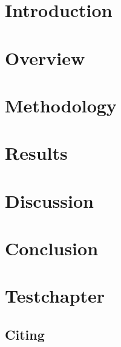 \documentclass[a4paper, english]{ttlab-qualify}
\begin{document}
    \cleardoubleoddpage


    \chapter{Introduction}
    

    \chapter{Overview}
    \label{ch:overview}
    


    \chapter{Methodology}
    \label{ch:methodology}
    


    \chapter{Results}
    \label{ch:results}


    \chapter{Discussion}
    \label{ch:discussion}

    \chapter{Conclusion}
    \label{ch:conclusion}

    \chapter{\latex Testchapter}
    \section{Citing}
    ~\cite{GERPARCOR}
\end{document}
